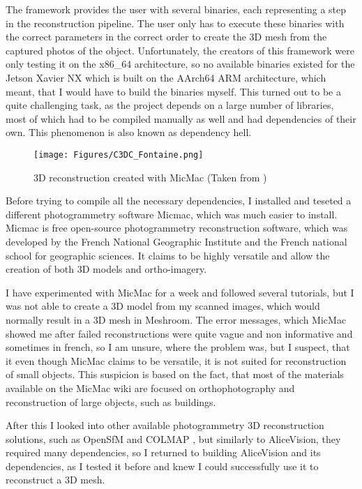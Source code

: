 The framework provides the user with several binaries, each representing a step in the reconstruction pipeline.
The user only has to execute these binaries with the correct parameters in the correct order to create the 3D mesh from the captured photos of the object.
Unfortunately, the creators of this framework were only testing it on the x86\_64 architecture, so no available binaries existed for the Jetson Xavier NX which is built on the AArch64 ARM architecture, which meant, that I would have to build the binaries myself.
This turned out to be a quite challenging task, as the project depends on a large number of libraries, most of which had to be compiled manually as well and had dependencies of their own.
This phenomenon is also known as dependency hell.

\begin{figure}[h!]
	\centering
	\texttt{[image: Figures/C3DC\_Fontaine.png]}	
	\caption{3D reconstruction created with MicMac (Taken from \cite{micmac_fontaine})}
\end{figure}

Before trying to compile all the necessary dependencies, I installed and teseted a different photogrammetry software Micmac, which was much easier to install.
Micmac is free open-source photogrammetry reconstruction software, which was developed by the French National Geographic Institute and the French national school for geographic sciences. \cite{micmac_2017}
It claims to be highly versatile and allow the creation of both 3D models and ortho-imagery.

I have experimented with MicMac for a week and followed several tutorials, but I was not able to create a 3D model from my scanned images, which would normally result in a 3D mesh in Meshroom.
The error messages, which MicMac showed me after failed reconstructions were quite vague and non informative and sometimes in french, so I am unsure, where the problem was, but I suspect, that it even though MicMac claims to be versatile, it is not suited for reconstruction of small objects.
This suspicion is based on the fact, that most of the materials available on the MicMac wiki are focused on orthophotography and reconstruction of large objects, such as buildings.


After this I looked into other available photogrammetry 3D reconstruction solutions, such as OpenSfM \cite{opensfm} and COLMAP \cite{schoenberger2016sfm, schoenberger2016mvs}, but similarly to AliceVision, they required many dependencies, so I returned to building AliceVision and its dependencies, as I tested it before and knew I could successfully use it to reconstruct a 3D mesh.

